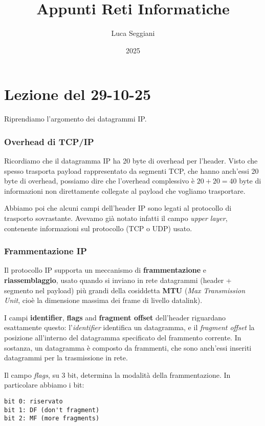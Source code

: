\documentclass[a4paper,11pt]{article}
\title{Appunti Reti Informatiche}
\author{Luca Seggiani}
\date{2025}
\begin{document}
\section{Lezione del 29-10-25}

\thispagestyle{empty}
\pagestyle{fancy}

Riprendiamo l'argomento dei datagrammi IP.

\subsubsection{Overhead di TCP/IP}
Ricordiamo che il datagramma IP ha 20 byte di overhead per l'header.
Visto che spesso trasporta payload rappresentato da segmenti TCP, che hanno anch'essi 20 byte di overhead, possiamo dire che l'overhead complessivo è $20 + 20 = 40$ byte di informazioni non direttamente collegate al payload che vogliamo trasportare.

Abbiamo poi che alcuni campi dell'header IP sono legati al protocollo di trasporto sovrastante.
Avevamo già notato infatti il campo \textit{upper layer}, contenente informazioni sul protocollo (TCP o UDP) usato.

\subsubsection{Frammentazione IP}
Il protocollo IP supporta un meccanismo di \textbf{frammentazione} e \textbf{riassemblaggio}, usato quando si inviano in rete datagrammi (header + segmento nel payload) più grandi della cosiddetta \textbf{MTU} (\textit{Max Transmission Unit}, cioè la dimensione massima dei frame di livello datalink). 

I campi \textbf{identifier}, \textbf{flags} and \textbf{fragment offset} dell'header riguardano esattamente questo: l'\textit{identifier} identifica un datagramma, e il \textit{fragment offset} la posizione all'interno del datagramma specificato del frammento corrente.
In sostanza, un datagramma è composto da frammenti, che sono anch'essi inseriti datagrammi per la trasmissione in rete.

Il campo \textit{flags}, su 3 bit, determina la modalità della frammentazione.
In particolare abbiamo i bit:
\begin{lstlisting}[style=codestyle]	
bit 0: riservato
bit 1: DF (don't fragment)
bit 2: MF (more fragments)
\end{lstlisting}
\end{document}
